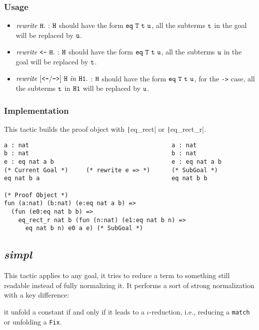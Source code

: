 \subsubsection*{Usage}
\begin{itemize}
\item ${\it rewrite\ \tt H}.$ : $\tt H$ should have the form $\tt eq\ T\ t\ u$, 
all the subterms $\tt t$ in the goal will be replaced by $\tt u$.
\item ${\it rewrite\ \texttt{<-}\ \tt H}.$ : $\tt H$ should have the form $\tt eq\ T\ t\ u$, 
    all the subterms $\tt u$ in the goal will be replaced by $\tt t$.
\item ${\it rewrite\ [\texttt{<-}/\texttt{->}]\ \tt H\ \it in\ \tt H1}.$ : 
    $\tt H$ should have the form $\tt eq\ T\ t\ u$, for the {\tt ->} case, all the 
    subterms $\tt t$ in $\tt H1$ will be replaced by $\tt u$.
\end{itemize}

\subsubsection*{Implementation}
This tactic builds the proof object with \texttt|eq_rect| or \texttt|eq_rect_r|.

\begin{center}
\begin{minipage}{0.7\textwidth}
\begin{verbatim}
a : nat                                        a : nat        
b : nat                                        b : nat        
e : eq nat a b                                 e : eq nat a b
(* Current Goal *)     (* rewrite e => *)      (* SubGoal *)
eq nat b a                                     eq nat b b

(* Proof Object *)
fun (a:nat) (b:nat) (e:eq nat a b) =>
  (fun (e0:eq nat b b) =>
    eq_rect_r nat b (fun (n:nat) (e1:eq nat b n) =>
      eq nat b n) e0 a e) (* SubGoal *)
\end{verbatim}
\end{minipage}
\end{center}

\subsection{\it simpl}
This tactic applies to any goal, it tries to reduce a term to something still readable instead of fully normalizing it. 
It performs a sort of strong normalization with a key difference:
\begin{center}
\begin{minipage}{0.7\textwidth}
it unfold a constant if and only if it leads to a $\iota$-reduction, i.e., reducing a {\tt match} or unfolding a {\tt Fix}.
\end{minipage}
\end{center}


